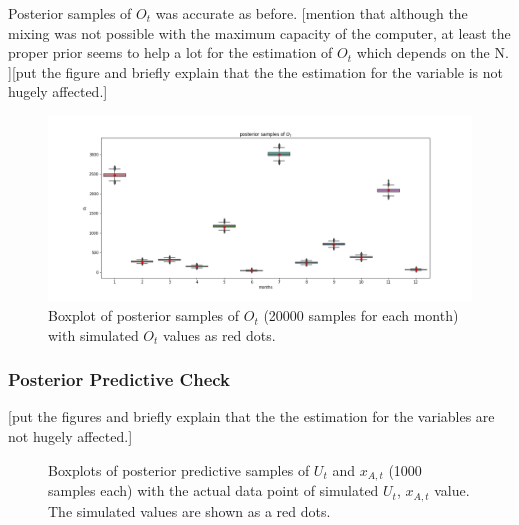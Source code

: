 \documentclass[12pt]{article}
\begin{document}
{Posterior samples of $O_t$ was accurate as before. [mention that although the mixing was not possible with the maximum capacity of the computer, at least the proper prior seems to help a lot for the estimation of $O_t$ which depends on the N. ][put the figure and briefly explain that the the estimation for the variable is not hugely affected.]
\begin{figure}[h]
	\centering
	\includegraphics[width=1\linewidth]{Figures/unknown_N_ot.png}

	\caption[Unobserved $N$: boxplot of posterior samples of $O_t$]{Boxplot of posterior samples of $O_t$ (20000 samples for each month) with simulated $O_t$ values as red dots.}
	\label{pst_ot_unk_n}
\end{figure}

\subsubsection{Posterior Predictive Check}

[put the figures and briefly explain that the the estimation for the variables are not hugely affected.]
\begin{figure}[htb]
	\centering
	\caption[Unobserved $N$: box plots of predictive posterior samples of $U_t$ and $x_{A,t}$]{Boxplots of posterior predictive samples of $U_t$ and $x_{A,t}$ (1000 samples each) with the actual data point of simulated $U_t$, $x_{A,t}$ value. The simulated values are shown as a red dots.}
	

\end{figure}}
\end{document}
